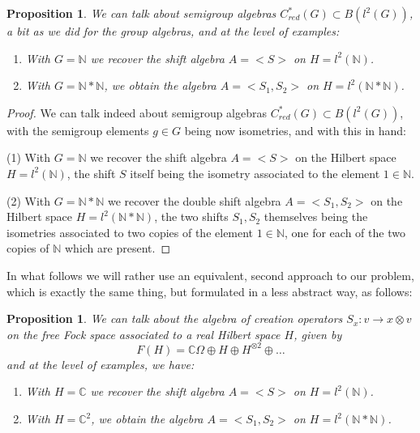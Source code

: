 \documentclass[12pt]{amsbook}
\newtheorem{proposition}[theorem]{Proposition}
\begin{document}
\begin{proposition}
We can talk about semigroup algebras $C^*_{red}(G)\subset B(l^2(G))$, a bit as we did for the group algebras, and at the level of examples:
\begin{enumerate}
\item With $G=\mathbb N$ we recover the shift algebra $A=<S>$ on $H=l^2(\mathbb N)$.

\item With $G=\mathbb N*\mathbb N$, we obtain the algebra $A=<S_1,S_2>$ on $H=l^2(\mathbb N*\mathbb N)$.
\end{enumerate}
\end{proposition}

\begin{proof}
We can talk indeed about semigroup algebras $C^*_{red}(G)\subset B(l^2(G))$, with the semigroup elements $g\in G$ being now isometries, and with this in hand:

\medskip

(1) With $G=\mathbb N$ we recover the shift algebra $A=<S>$ on the Hilbert space $H=l^2(\mathbb N)$, the shift $S$ itself being the isometry associated to the element $1\in\mathbb N$.

\medskip

(2) With $G=\mathbb N*\mathbb N$ we recover the double shift algebra $A=<S_1,S_2>$ on the Hilbert space $H=l^2(\mathbb N*\mathbb N)$, the two shifts $S_1,S_2$ themselves being the isometries associated to two copies of the element $1\in\mathbb N$, one for each of the two copies of $\mathbb N$ which are present.
\end{proof}

In what follows we will rather use an equivalent, second approach to our problem, which is exactly the same thing, but formulated in a less abstract way, as follows:


\begin{proposition}
We can talk about the algebra of creation operators $S_x:v\to x\otimes v$ on the free Fock space associated to a real Hilbert space $H$, given by 
$$F(H)=\mathbb C\Omega\oplus H\oplus H^{\otimes2}\oplus\ldots$$
and at the level of examples, we have:
\begin{enumerate}
\item With $H=\mathbb C$ we recover the shift algebra $A=<S>$ on $H=l^2(\mathbb N)$.

\item With $H=\mathbb C^2$, we obtain the algebra $A=<S_1,S_2>$ on $H=l^2(\mathbb N*\mathbb N)$.
\end{enumerate}
\end{proposition}
\end{document}
